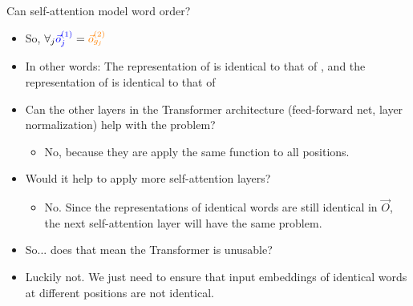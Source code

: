 \begin{vbframe}{Can self-attention model word order?}

\vfill

\begin{itemize}
\item So, $\forall_j \textcolor{blue}{\vec o^{(1)}_j} = \textcolor{orange}{\vec o^{(2)}_{g_j}}$
\item In other words: The representation of  is identical to that of , and the representation of  is identical to that of 
\item \ques Can the other layers in the Transformer architecture (feed-forward net, layer normalization) help with the problem?
\begin{itemize}
\item No, because they are apply the same function to all positions.
\end{itemize}
\item \ques Would it help to apply more self-attention layers?
\begin{itemize}
\item No. Since the representations of identical words are still identical in $\vec O$, the next self-attention layer will have the same problem.
\end{itemize}
\item So... does that mean the Transformer is unusable?
\item Luckily not. We just need to ensure that input embeddings of identical words at different positions are not identical. 
\end{itemize}

\vfill

\end{vbframe}


